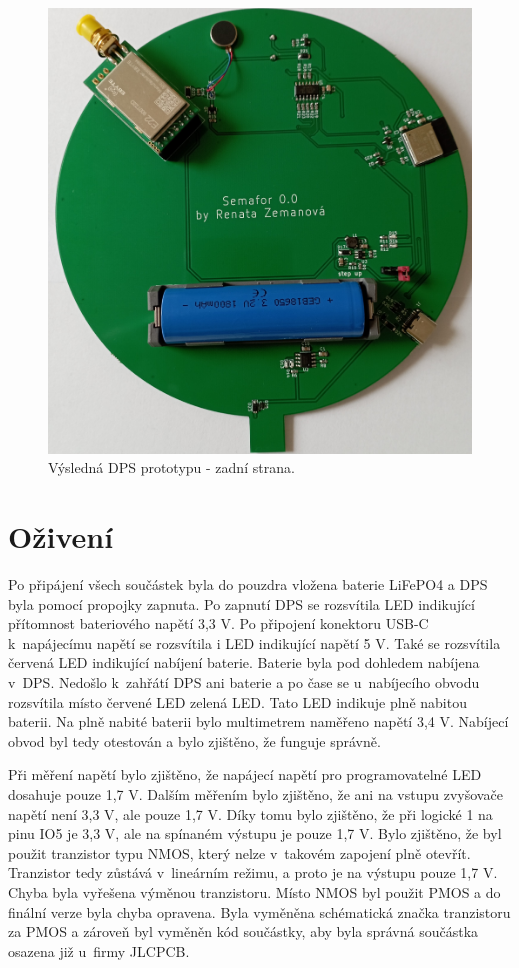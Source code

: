 \begin{figure}[!h]
  \begin{center}
    \includegraphics[scale=0.15]{obrazky/DPS_prototyp_bottom.jpg}
  \end{center}
  \caption[Výsledná DPS prototypu - zadní strana]{Výsledná DPS prototypu - zadní strana.}
\end{figure}

\section{Oživení}
Po připájení všech součástek byla do pouzdra vložena baterie LiFePO4 a DPS byla pomocí propojky zapnuta. Po zapnutí DPS se rozsvítila LED indikující přítomnost bateriového napětí 3,3 V. 
Po připojení konektoru USB-C k~napájecímu napětí se rozsvítila i LED indikující napětí 5 V. Také se rozsvítila červená LED indikující nabíjení baterie. Baterie byla pod dohledem 
nabíjena v~DPS. Nedošlo k~zahřátí DPS ani baterie a po čase se u~nabíjecího obvodu rozsvítila místo červené LED zelená LED. Tato LED indikuje plně nabitou baterii. Na plně nabité 
baterii bylo multimetrem naměřeno napětí 3,4 V. Nabíjecí obvod byl tedy otestován a bylo zjištěno, že funguje správně. 

Při měření napětí bylo zjištěno, že napájecí napětí pro programovatelné LED dosahuje pouze 1,7 V. Dalším měřením bylo zjištěno, že ani na vstupu zvyšovače napětí není 3,3 V, ale 
pouze 1,7 V. Díky tomu bylo zjištěno, že při logické 1 na pinu IO5 je 3,3 V, ale na spínaném výstupu je pouze 1,7 V. Bylo zjištěno, že byl použit tranzistor typu NMOS, který nelze 
v~takovém zapojení plně otevřít. Tranzistor tedy zůstává v~lineárním režimu, a proto je na výstupu pouze 1,7 V. Chyba byla vyřešena výměnou tranzistoru. Místo NMOS byl použit PMOS 
a do finální verze byla chyba opravena. Byla vyměněna schématická značka tranzistoru za PMOS a zároveň byl vyměněn kód součástky, aby byla správná součástka osazena již u~firmy JLCPCB. 


